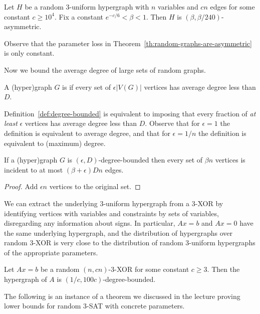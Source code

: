\documentclass[a4paper,twoside,justified]{tufte-handout}
\begin{document}
\begin{theorem}
  \label{th:random-graphs-are-asymmetric}
  Let $H$ be a random $3$-uniform hypergraph with $n$ variables and $cn$ edges for some constant $c \geq 10^4$. Fix a constant $e^{-c/6} < \beta < 1$. Then \whp $H$ is $(\beta,\beta/240)$-asymmetric.
\end{theorem}

Observe that the parameter loss in Theorem~\ref{th:random-graphs-are-asymmetric} is only constant.

Now we bound the average degree of large sets of random graphs.

\begin{definition}
  \label{def:degree-bounded}
  A (hyper)graph $G$ is  if every set of $\epsilon|V(G)|$ vertices has average degree less than $D$.
\end{definition}

Definition~\ref{def:degree-bounded} is equivalent to imposing that every fraction of \emph{at least} $\epsilon$ vertices has average degree less than $D$. Observe that for $\epsilon=1$ the definition is equivalent to average degree, and that for $\epsilon = 1/n$ the definition is equivalent to (maximum) degree.

\begin{lemma}
  \label{lem:degree-bounded-few-edges}
  If a (hyper)graph $G$ is $(\epsilon,D)$-degree-bounded then every set of $\beta n$ vertices is incident to at most $(\beta + \epsilon)Dn$ edges.
\end{lemma}
\begin{proof}
  Add $\epsilon n$ vertices to the original set.
\end{proof}

We can extract the underlying 3-uniform hypergraph from a 3-XOR by identifying vertices with variables and constraints by sets of variables, disregarding any information about signs. In particular, $Ax=b$ and $Ax=0$ have the same underlying hypergraph, and the distribution of hypergraphs over random 3-XOR is very close to the distribution of random 3-uniform hypergraphs of the appropriate parameters.

\begin{lemma}
  \label{lem:random-graphs-are-degree-bounded}
  Let $Ax=b$ be a random $(n,cn)$-3-XOR for some constant $c \geq 3$. Then \whp the hypergraph of $A$ is $(1/c,100c)$-degree-bounded.
\end{lemma}

The following is an instance of a theorem we discussed in the lecture proving lower bounds for random 3-SAT with concrete parameters.
\end{document}
